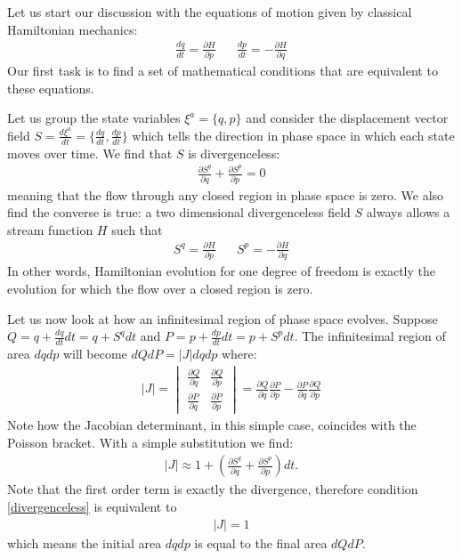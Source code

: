 \documentclass[10pt,twocolumn, nofootinbib]{revtex4-2}
\begin{document}
Let us start our discussion with the equations of motion given by classical Hamiltonian mechanics:
\begin{align}\label{HamiltonEquations1}
	\frac{dq}{dt} = \frac{\partial H}{\partial p} \; \; \; \; \; \; \frac{dp}{dt} = - \frac{\partial H}{\partial q}
\end{align}
Our first task is to find a set of mathematical conditions that are equivalent to these equations.

Let us group the state variables $\xi^a = \{q, p\}$ and consider the displacement vector field $S = \frac{d\xi^a}{dt} = \{ \frac{dq}{dt}, \frac{dp}{dt} \} $ which tells the direction in phase space in which each state moves over time. We find that $S$ is divergenceless:
\begin{align}\label{divergenceless}
\frac{\partial S^q}{\partial q} + \frac{\partial S^p}{\partial p} =0
\end{align}
meaning that the flow through any closed region in phase space is zero. We also find the converse is true: a two dimensional divergenceless field $S$ always allows a stream function $H$ such that
\begin{align}
	S^q = \frac{\partial H}{\partial p} \; \; \; \; \; \; S^p = - \frac{\partial H}{\partial q}
\end{align}
In other words, Hamiltonian evolution for one degree of freedom is exactly the evolution for which the flow over a closed region is zero.

Let us now look at how an infinitesimal region of phase space evolves. Suppose $Q = q + \frac{dq}{dt} dt = q + S^q dt$ and $P = p + \frac{dp}{dt} dt = p + S^p dt$. The infinitesimal region of area $dq dp$ will become $dQ dP = |J| dq dp$ where:
\begin{align}
	|J| = \begin{vmatrix}
		\frac{\partial Q}{\partial q} & \frac{\partial Q}{\partial p} \\
		\frac{\partial P}{\partial q} & \frac{\partial P}{\partial  p} 
	\end{vmatrix} = \frac{\partial Q}{\partial q} \frac{\partial P}{\partial  p} - \frac{\partial P}{\partial q} \frac{\partial Q}{\partial p}
\end{align}
Note how the Jacobian determinant, in this simple case, coincides with the Poisson bracket. With a simple substitution we find:
\begin{align}
	|J|\approx 1 + \left( \frac{\partial S^q}{\partial q} + \frac{\partial S^p}{\partial p} \right)dt.
\end{align}
Note that the first order term is exactly the divergence, therefore condition \eqref{divergenceless} is equivalent to
\begin{align}\label{UnitaryJacobian}
	|J| = 1
\end{align}
which means the initial area $dqdp$ is equal to the final area $dQdP$.
\end{document}

